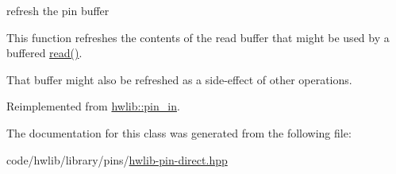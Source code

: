 refresh the pin buffer

This function refreshes the contents of the read buffer that might be used by a buffered \hyperlink{classhwlib_1_1pin__direct__from__in__t_aa0f886a0c110b2bd259c6d3d25e50ee3}{read()}.

That buffer might also be refreshed as a side-\/effect of other operations. 

Reimplemented from \hyperlink{classhwlib_1_1pin__in_a3fb1bfb1ec962bb6d31a5e865f0d0acb}{hwlib\+::pin\+\_\+in}.



The documentation for this class was generated from the following file\+:\begin{DoxyCompactItemize}
\item 
code/hwlib/library/pins/\hyperlink{hwlib-pin-direct_8hpp}{hwlib-\/pin-\/direct.\+hpp}\end{DoxyCompactItemize}
